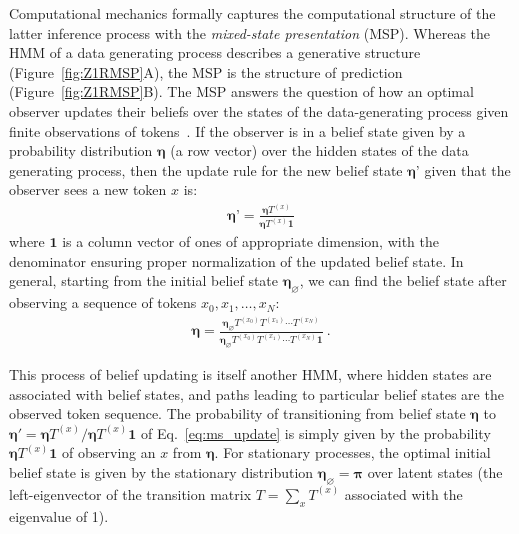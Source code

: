 \documentclass{article}
\newcommand{\ms}{\boldsymbol{\eta}}
\newcommand{\startms}{\ms_{\varnothing}}
\newcommand{\one}{\boldsymbol{1}}
\newcommand{\stationary}{\boldsymbol{\pi}}
\begin{document}
Computational mechanics formally captures the computational structure of the latter inference process with the \textit{mixed-state presentation} (MSP). Whereas the HMM of a data generating process describes a generative structure (Figure~\ref{fig:Z1RMSP}A), the MSP is the structure of prediction (Figure~\ref{fig:Z1RMSP}B). The MSP answers the question of how an optimal observer updates their beliefs over the states of the data-generating process given finite observations of tokens~\citep{Riec18_SSAC1, Jurg21_Shannon}. If the observer is in a belief state given by a probability distribution \( \ms \) (a row vector) over the hidden states of the data generating process, then the update rule for the new belief state \( \ms’ \) given that the observer sees a new token $x$ is:
\begin{align}
\ms’ = \frac{\ms T^{(x)}}{\ms T^{(x)} \one}
\label{eq:ms_update}
\end{align}
where $\one$ is a column vector of ones of appropriate dimension, with the denominator ensuring proper normalization of the updated belief state. In general, starting from the initial belief state $\startms$, we can find the belief state after observing a sequence of tokens $x_0, x_1, \dots , x_N$:
\begin{align}
\ms = \frac{\startms T^{(x_0)} T^{(x_1)} \cdots T^{(x_N)}}{\startms T^{(x_0)} T^{(x_1)} \cdots T^{(x_N)} \one} ~.
\end{align}

This process of belief updating is itself another HMM, where hidden states are associated with belief states, and paths leading to particular belief states are the observed token sequence. The probability of transitioning from belief state $\ms$ to $\ms' = \ms T^{(x)} / \ms T^{(x)} \one$ of Eq.~\eqref{eq:ms_update} is simply given by the probability $\ms T^{(x)} \one$ of observing an $x$ from $\ms$. For stationary processes, the optimal initial belief state is given by the stationary distribution $\startms = \stationary$ over latent states (the left-eigenvector of the transition matrix $T=\sum_x T^{(x)}$ associated with the eigenvalue of 1). 
\end{document}
